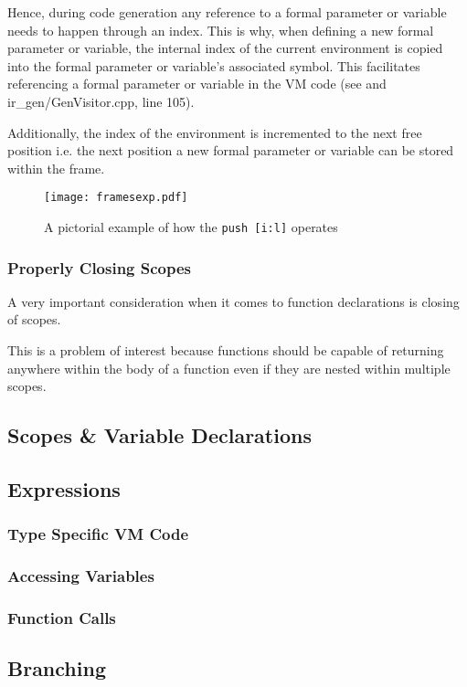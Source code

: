 Hence, during code generation any reference to a formal
parameter or variable needs to happen through an index. This is
why, when defining a new formal parameter or variable, the
internal index of the current environment is copied into the
formal parameter or variable's associated symbol. This
facilitates referencing a formal parameter or variable in the VM
code (see  and ir\_gen/GenVisitor.cpp, line
105).

Additionally, the index of the environment is incremented to the
next free position i.e. the next position a new formal parameter
or variable can be stored within the frame.

\begin{figure}[H]
\centering
\begin{mdframed}[backgroundcolor=UMPaleRed]
\texttt{[image: framesexp.pdf]}
\end{mdframed}
\caption{A pictorial example of how the \mbox{\texttt{push
[i:l]}} operates}
\label{fig:framesexp}
\end{figure}

\subsubsection{Properly Closing Scopes}

A very important consideration when it comes to
function declarations is closing of scopes.

This is a problem of interest because functions should be
capable of returning anywhere within the body of a function even
if they are nested within multiple scopes.

\subsection{Scopes \& Variable Declarations}

\subsection{Expressions}

\subsubsection{Type Specific VM Code}

\subsubsection{Accessing Variables}

\subsubsection{Function Calls}

\subsection{Branching}
